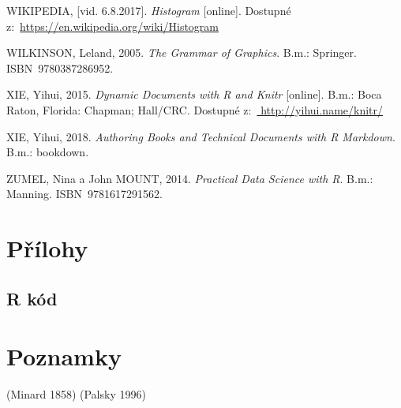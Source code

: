 \documentclass[12pt,]{article}
\begin{document}
\hypertarget{ref-hist_wiki}{}
WIKIPEDIA, {[}vid. 6.8.2017{]}. \emph{Histogram} {[}online{]}. Dostupné
z:~\url{https://en.wikipedia.org/wiki/Histogram}

\hypertarget{ref-wilkinson2005}{}
WILKINSON, Leland, 2005. \emph{The Grammar of Graphics}. B.m.: Springer.
ISBN~9780387286952.

\hypertarget{ref-knitr}{}
XIE, Yihui, 2015. \emph{Dynamic Documents with R and Knitr}
{[}online{]}. B.m.: Boca Raton, Florida: Chapman; Hall/CRC. Dostupné
z:~\href{\%20http://yihui.name/knitr/}{ http://yihui.name/knitr/}

\hypertarget{ref-rmd:bookdown}{}
XIE, Yihui, 2018. \emph{Authoring Books and Technical Documents with R
Markdown}. B.m.: bookdown.

\hypertarget{ref-zumel_2014}{}
ZUMEL, Nina a John MOUNT, 2014. \emph{Practical Data Science with R}.
B.m.: Manning. ISBN~9781617291562.

\newpage

\section*{Přílohy}\label{prilohy}

\label{prilohy}

\subsection{R kód}\label{r-kod}

\newpage

\section*{Poznamky}

\thispagestyle{empty}

(Minard 1858) (Palsky 1996)
\end{document}
